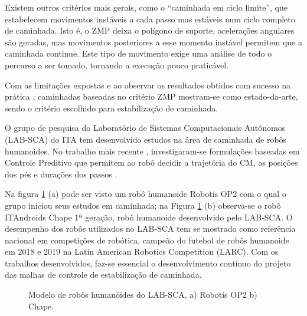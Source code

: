 Existem outros critérios mais gerais, como o ``caminhada em ciclo limite'', \cite{inbook} que estabelecem movimentos instáveis a cada passo mas estáveis num ciclo completo de caminhada. Isto é, o ZMP deixa o polígono de suporte, acelerações angulares são geradas, mas movimentos posteriores a esse momento instável permitem que a caminhada continue. Este tipo de movimento exige uma análise de todo o percurso a ser tomado, tornando a execução pouco praticável.

Com as limitações expostas e ao observar os resultados obtidos com sucesso na prática \cite{tedrake2005}, caminhadas baseadas no critério ZMP mostram-se como estado-da-arte, sendo o critério escolhido para estabilização de caminhada.


O grupo de pesquisa do Laboratório de Sistemas Computacionais Autônomos (LAB-SCA) do ITA tem desenvolvido estudos na área de caminhada de robôs humanoides\cite{max22,max25,max27,max28,tesemarcos}.
No trabalho mais recente \cite{tesemarcos}, investigaram-se formulações baseadas em  Controle Preditivo  que permitem ao robô decidir a 
trajetória do CM, as posições dos pés e durações dos passos \cite{7759794}.

Na figura \ref{FIG:darwinchape} (a) pode ser visto um robô humanoide Robotis OP2 com o qual o grupo iniciou seus estudos em caminhada; na Figura \ref{FIG:darwinchape} (b) observa-se o robô ITAndroids Chape 1ª geração, robô humanoide desenvolvido pelo LAB-SCA. O desempenho dos robôs utilizados no LAB-SCA tem se mostrado como referência nacional em competições de robótica, campeão do futebol de robôs humanoide em 2018 e 2019 na Latin American Robotics Competition (LARC). Com os trabalhos desenvolvidos, faz-se essencial o desenvolvimento contínuo do projeto das malhas de controle de estabilização de caminhada.

\begin{figure}[phtb]
\centering
	\centering
\caption{Modelo de robôs humanóides do LAB-SCA, a) Robotis OP2 b) Chape.}
\label{FIG:darwinchape}
\end{figure}

